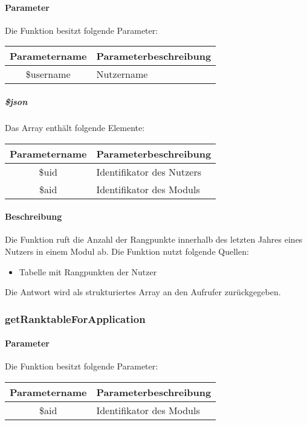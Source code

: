 \paragraph{Parameter} Die Funktion besitzt folgende Parameter:
\begin{table}[H]
	\begin{tabular}{|c|p{11cm}|}
		\hline
		\textbf{Parametername} & \textbf{Parameterbeschreibung} \\ \hline
		\$username & Nutzername \\ \hline
	\end{tabular}
\end{table}
\subparagraph{\$json}Das Array enthält folgende Elemente:
\begin{table}[H]
	\begin{tabular}{|c|p{11cm}|}
		\hline
		\textbf{Parametername} & \textbf{Parameterbeschreibung} \\ \hline
		\$uid   & Identifikator des Nutzers \\ \hline
		\$aid   & Identifikator des Moduls \\ \hline
	\end{tabular}
\end{table}
\paragraph{Beschreibung} Die Funktion ruft die Anzahl der Rangpunkte innerhalb des letzten Jahres eines Nutzers in einem Modul ab. Die Funktion nutzt folgende Quellen:
\begin{itemize}
	\item Tabelle mit Rangpunkten der Nutzer
\end{itemize}
Die Antwort wird als strukturiertes Array an den Aufrufer zurückgegeben.
\subsubsection{getRanktableForApplication}
\paragraph{Parameter} Die Funktion besitzt folgende Parameter:
\begin{table}[H]
	\begin{tabular}{|c|p{11cm}|}
		\hline
		\textbf{Parametername} & \textbf{Parameterbeschreibung} \\ \hline
		\$aid   & Identifikator des Moduls \\ \hline
	\end{tabular}
\end{table}
